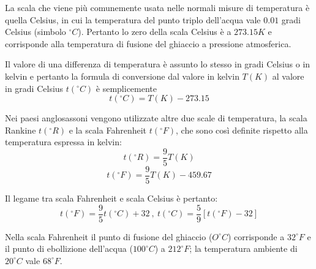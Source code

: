 \documentclass[class=book, crop=false, oneside, 12pt]{standalone}
\begin{document}
La scala che viene più comunemente usata nelle normali misure di temperatura è quella Celsius, in cui la temperatura del punto triplo dell'acqua vale \(0.01\) gradi Celsius (simbolo \(^{\circ} C\)).
Pertanto lo zero della scala Celsius è a \(273.15 K\) e corrisponde alla temperatura di fusione del ghiaccio a pressione atmosferica. 

Il valore di una differenza di temperatura è assunto lo stesso in gradi Celsius o in kelvin e pertanto la formula di conversione dal valore in kelvin \(T (K)\) al valore in gradi Celsius \(t ( ^{\circ} C)\) è semplicemente
\begin{equation*}
    t (^{\circ} C) = T (K) - 273.15
\end{equation*}

Nei paesi anglosassoni vengono utilizzate altre due scale di temperatura, la scala Rankine \(t ( ^{\circ} R)\) e la scala Fahrenheit \( t ( ^{\circ} F)\), che sono così definite rispetto alla temperatura espressa in kelvin:
\begin{equation*}
    t ( ^{\circ} R) = \frac{9}{5} T (K)
\end{equation*}
\begin{equation*}
    t (^{\circ} F) = \frac{9}{5} T (K) - 459.67
\end{equation*}

Il legame tra scala Fahrenheit e scala Celsius è pertanto:
\begin{equation*}
    t (^{\circ} F) = \frac{9}{5} t (^{\circ} C) + 32 \ , \ t(^{\circ} C) = \frac{5}{9} \left[t (^{\circ} F ) - 32\right]
\end{equation*}

Nella scala Fahrenheit il punto di fusione del ghiaccio (\(O ^{\circ} C \)) corrisponde a \(32 ^{\circ} F\) e il punto di ebollizione dell'acqua (\(100 ^{\circ} C\)) a \(212 ^{\circ} F\); la temperatura ambiente di \(20 ^{\circ} C\) vale \(68 ^{\circ} F\). 
\end{document}
